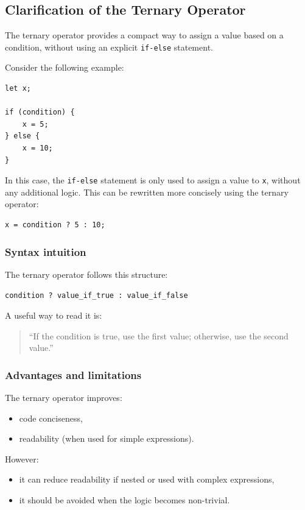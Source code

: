 \documentclass{scrbook}
\begin{document}
\subsection{Clarification of the Ternary Operator}

The ternary operator provides a compact way to assign a value based on a condition, without using an explicit \texttt{if-else} statement.

Consider the following example:

\begin{lstlisting}
let x;

if (condition) {
    x = 5;
} else {
    x = 10;
}
\end{lstlisting}

In this case, the \texttt{if-else} statement is only used to assign a value to \texttt{x}, without any additional logic. This can be rewritten more concisely using the ternary operator:

\begin{lstlisting}
x = condition ? 5 : 10;
\end{lstlisting}

\subsubsection*{Syntax intuition}

The ternary operator follows this structure:

\begin{center}
\texttt{condition ? value\_if\_true : value\_if\_false}
\end{center}

A useful way to read it is:
\begin{quote}
``If the condition is true, use the first value; otherwise, use the second value.''
\end{quote}

\subsubsection*{Advantages and limitations}

The ternary operator improves:
\begin{itemize}
    \item code conciseness,
    \item readability (when used for simple expressions).
\end{itemize}

However:
\begin{itemize}
    \item it can reduce readability if nested or used with complex expressions,
    \item it should be avoided when the logic becomes non-trivial.
\end{itemize}
\end{document}
